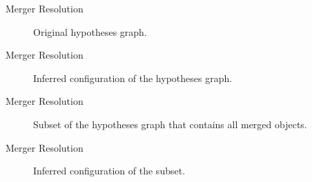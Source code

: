 \begin{frame}{Merger Resolution}
    \begin{figure}
        \centering
        \scalebox{0.7}{
            \begin{tikzpicture}[minimum size=58pt,scale=0.45, every node/.style={scale=0.45, font=\LARGE}, thick]
                
            \end{tikzpicture}
        }
        \caption{Original hypotheses graph.}
        \label{fig:conservation-hyp-inferred}
    \end{figure}
\end{frame}

\begin{frame}{Merger Resolution}
    \begin{figure}
        \centering
        \scalebox{0.7}{
            \begin{tikzpicture}[minimum size=58pt,scale=0.45, every node/.style={scale=0.45, font=\LARGE}, thick]
                
            \end{tikzpicture}
        }
        \caption{Inferred configuration of the hypotheses graph.}
        \label{fig:conservation-hyp-inferred}
    \end{figure}
\end{frame}

\begin{frame}{Merger Resolution}
    \begin{figure}
        \centering
        \scalebox{0.7}{
            \begin{tikzpicture}[minimum size=58pt,scale=0.45, every node/.style={scale=0.45, font=\LARGE}, thick]
                
            \end{tikzpicture}
        }
        \caption{Subset of the hypotheses graph that contains all merged objects.}
        \label{fig:conservation-hyp-inferred}
    \end{figure}
\end{frame}

\begin{frame}{Merger Resolution}
    \begin{figure}
        \centering
        \scalebox{0.7}{
            \begin{tikzpicture}[minimum size=58pt,scale=0.45, every node/.style={scale=0.45, font=\LARGE}, thick]
                
            \end{tikzpicture}
        }
        \caption{Inferred configuration of the subset.}
        \label{fig:conservation-hyp-inferred}
    \end{figure}
\end{frame}

